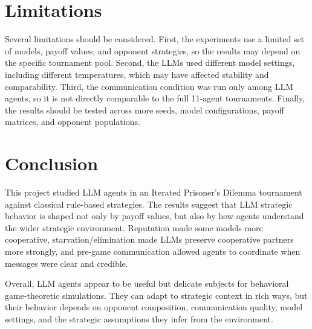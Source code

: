 \documentclass[11pt]{article}
\begin{document}
\section{Limitations}

Several limitations should be considered. First, the experiments use a limited set of models, payoff values, and opponent strategies, so the results may depend on the specific tournament pool. Second, the LLMs used different model settings, including different temperatures, which may have affected stability and comparability. Third, the communication condition was run only among LLM agents, so it is not directly comparable to the full 11-agent tournaments. Finally, the results should be tested across more seeds, model configurations, payoff matrices, and opponent populations.

\section{Conclusion}

This project studied LLM agents in an Iterated Prisoner's Dilemma tournament against classical rule-based strategies. The results suggest that LLM strategic behavior is shaped not only by payoff values, but also by how agents understand the wider strategic environment. Reputation made some models more cooperative, starvation/elimination made LLMs preserve cooperative partners more strongly, and pre-game communication allowed agents to coordinate when messages were clear and credible.

Overall, LLM agents appear to be useful but delicate subjects for behavioral game-theoretic simulations. They can adapt to strategic context in rich ways, but their behavior depends on opponent composition, communication quality, model settings, and the strategic assumptions they infer from the environment.
\end{document}
